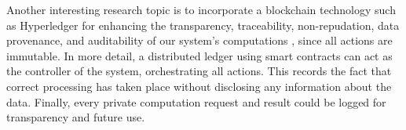 Another interesting research topic is to incorporate a blockchain technology such as Hyperledger \cite{cachin2016architecture} for enhancing the transparency, traceability,  non-repudation, data provenance, and auditability of our system's computations \cite{zyskind2015decentralizing}, since all actions are immutable.
In more detail, a distributed ledger using smart contracts can act as the controller of the system, orchestrating all actions.
This records the fact that correct processing has taken place without disclosing any information about the data.
Finally, every private computation request and result could be logged for transparency and future use.

